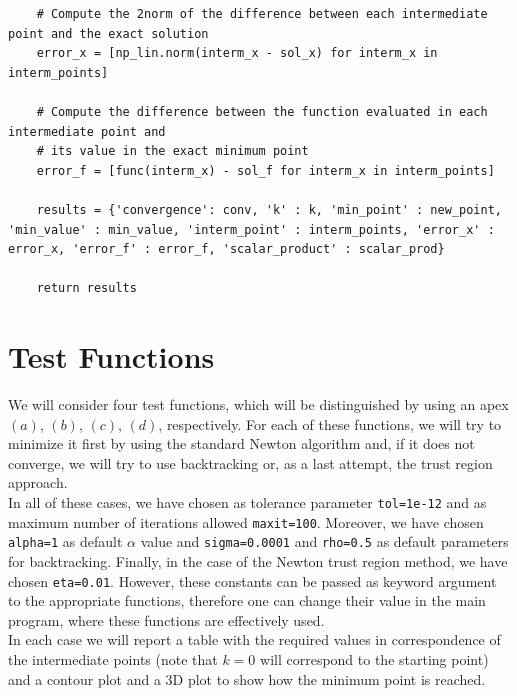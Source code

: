 \documentclass[a4paper,11pt]{article}
\begin{document}
\begin{verbatim}
    # Compute the 2norm of the difference between each intermediate point and the exact solution
    error_x = [np_lin.norm(interm_x - sol_x) for interm_x in interm_points]

    # Compute the difference between the function evaluated in each intermediate point and 
    # its value in the exact minimum point
    error_f = [func(interm_x) - sol_f for interm_x in interm_points]

    results = {'convergence': conv, 'k' : k, 'min_point' : new_point, 'min_value' : min_value, 'interm_point' : interm_points, 'error_x' : error_x, 'error_f' : error_f, 'scalar_product' : scalar_prod}

    return results
\end{verbatim}


	\section{Test Functions}
	We will consider four test functions, which will be distinguished by using an apex $(a)$, $(b)$, $(c)$, $(d)$, respectively. For each of these functions, we will try to minimize it first by using the standard Newton algorithm and, if it does not converge, we will try to use backtracking or, as a last attempt, the trust region approach.\\
	
	\noindent In all of these cases, we have chosen as tolerance parameter  \texttt{tol=1e-12} and as maximum number of iterations allowed \texttt{maxit=100}. Moreover, we have chosen \texttt{alpha=1} as default $\alpha$ value and \texttt{sigma=0.0001} and \texttt{rho=0.5} as default parameters for backtracking. Finally, in the case of the Newton trust region method, we have chosen \texttt{eta=0.01}. However, these constants can be passed as keyword argument to the appropriate functions, therefore one can change their value in the main program, where these functions are effectively used.\\
	
	\noindent In each case we will report a table with the required values in correspondence of the intermediate points (note that $k=0$ will correspond to the starting point) and a contour plot and a 3D plot to show how the minimum point is reached.
	
	
\end{document}
